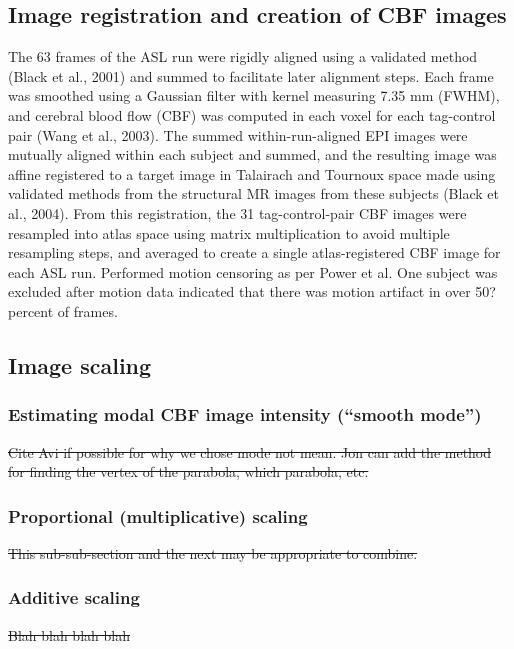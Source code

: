 \subsection{Image registration and creation of CBF images}
The 63 frames of the ASL run were rigidly aligned using a validated method (Black et al., 2001) and summed to facilitate later alignment steps. Each frame was smoothed using a Gaussian filter with kernel measuring 7.35 mm (FWHM), and cerebral blood flow (CBF) was computed in each voxel for each tag-control pair (Wang et al., 2003). The summed within-run-aligned EPI images were mutually aligned within each subject and summed, and the resulting image was affine registered to a target image in Talairach and Tournoux space made using validated methods from the structural MR images from these subjects (Black et al., 2004). From this registration, the 31 tag-control-pair CBF images were resampled into atlas space using matrix multiplication to avoid multiple resampling steps, and averaged to create a single atlas-registered CBF image for each ASL run. 
Performed motion censoring as per Power et al. One subject was excluded after motion data indicated that there was motion artifact in over 50? percent of frames.

\subsection{Image scaling}
\subsubsection{Estimating modal CBF image intensity (``smooth mode'')}
\sout{Cite Avi if possible for why we chose mode not mean. Jon can add the method for finding the vertex of the parabola, which parabola, etc.} 
\subsubsection{Proportional (multiplicative) scaling}
\sout{This sub-sub-section and the next may be appropriate to combine.}
\subsubsection{Additive scaling}
\sout{Blah blah blah blah}

